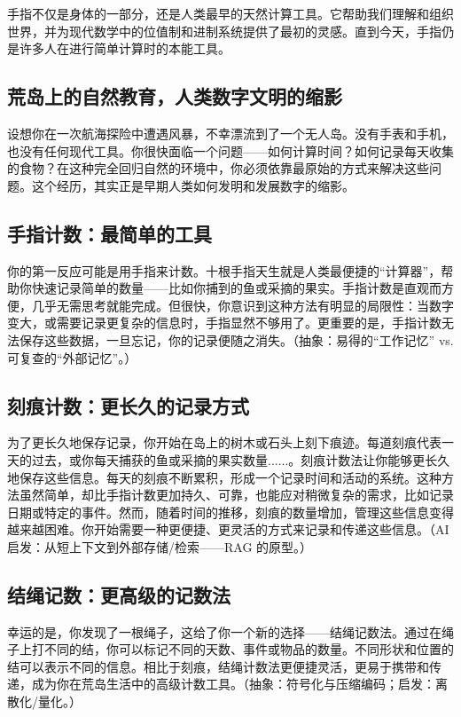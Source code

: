 手指不仅是身体的一部分，还是人类最早的天然计算工具。它帮助我们理解和组织世界，并为现代数学中的位值制和进制系统提供了最初的灵感。直到今天，手指仍是许多人在进行简单计算时的本能工具。

\subsection{荒岛上的自然教育，人类数字文明的缩影}
设想你在一次航海探险中遭遇风暴，不幸漂流到了一个无人岛。没有手表和手机，也没有任何现代工具。你很快面临一个问题——如何计算时间？如何记录每天收集的食物？在这种完全回归自然的环境中，你必须依靠最原始的方式来解决这些问题。这个经历，其实正是早期人类如何发明和发展数字的缩影。

\subsection*{手指计数：最简单的工具}
你的第一反应可能是用手指来计数。十根手指天生就是人类最便捷的“计算器”，帮助你快速记录简单的数量——比如你捕到的鱼或采摘的果实。手指计数是直观而方便，几乎无需思考就能完成。但很快，你意识到这种方法有明显的局限性：当数字变大，或需要记录更复杂的信息时，手指显然不够用了。更重要的是，手指计数无法保存这些数据，一旦忘记，你的记录便随之消失。{（抽象：易得的“工作记忆” vs. 可复查的“外部记忆”。）}

\subsection*{刻痕计数：更长久的记录方式}
为了更长久地保存记录，你开始在岛上的树木或石头上刻下痕迹。每道刻痕代表一天的过去，或你每天捕获的鱼或采摘的果实数量......。刻痕计数法让你能够更长久地保存这些信息。每天的刻痕不断累积，形成一个记录时间和活动的系统。这种方法虽然简单，却比手指计数更加持久、可靠，也能应对稍微复杂的需求，比如记录日期或特定的事件。然而，随着时间的推移，刻痕的数量增加，管理这些信息变得越来越困难。你开始需要一种更便捷、更灵活的方式来记录和传递这些信息。{（AI 启发：从短上下文到外部存储/检索——RAG 的原型。）}

\subsection*{结绳记数：更高级的记数法}
幸运的是，你发现了一根绳子，这给了你一个新的选择——结绳记数法。通过在绳子上打不同的结，你可以标记不同的天数、事件或物品的数量。不同形状和位置的结可以表示不同的信息。相比于刻痕，结绳计数法更便捷灵活，更易于携带和传递，成为你在荒岛生活中的高级计数工具。{（抽象：符号化与压缩编码；启发：离散化/量化。）}

